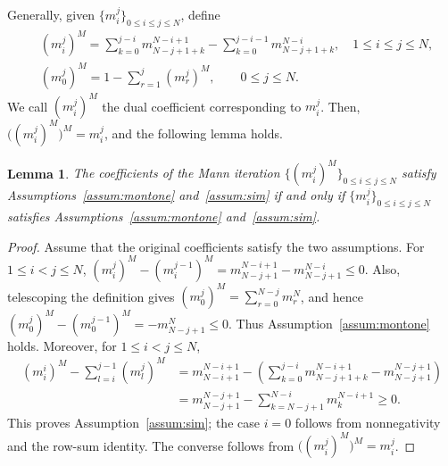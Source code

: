 \documentclass[pdflatex,sn-mathphys-num]{sn-jnl}%
\theoremstyle{thmstyleone}%
\theoremstyle{thmstyletwo}%
\theoremstyle{thmstylethree}%
\newtheorem{lemma}{Lemma}%
\begin{document}
Generally, given $\{m_i^j\}_{0\le i \le j\le N}$, define
\begin{align*}
&(m_i^j)^M=\sum_{k=0}^{j-i}m_{N-j+1+k}^{N-i+1}-\sum_{k=0}^{j-i-1}m_{N-j+1+k}^{N-i}, \quad  1\le i\le j\le N,\\
&(m_0^j)^M=1-\sum_{r=1}^{j}(m_r^j)^M,\qquad 0\le j\le N.
\end{align*}
We call $(m_i^j)^M$ the dual coefficient corresponding to $m_i^j$. 
Then, $\bigl((m_i^j)^M\bigr)^M=m_i^j$, and the following lemma holds.

\begin{lemma}\label{m_dual_coef}
The coefficients of the Mann iteration $\{(m_i^j)^M\}_{0\le i \le j\le N}$ satisfy Assumptions~\ref{assum:montone} and~\ref{assum:sim} if and only if $\{m_i^j\}_{0\le i \le j\le N}$ satisfies Assumptions~\ref{assum:montone} and~\ref{assum:sim}.
\end{lemma}


\begin{proof}
Assume that the original coefficients satisfy the two assumptions. For $1\le i<j\le N$, $(m_i^j)^M-(m_i^{j-1})^M=m_{N-j+1}^{N-i+1}-m_{N-j+1}^{N-i}\le0.$
Also, telescoping the definition gives $(m_0^j)^M=\sum_{r=0}^{N-j}m_r^N$, and hence $(m_0^j)^M-(m_0^{j-1})^M=- m_{N-j+1}^N \le 0.$
Thus Assumption~\ref{assum:montone} holds. Moreover, for $1\le i<j\le N$,
\begin{align*}
(m_i^i)^M-\sum_{l=i}^{j-1}(m_l^j)^M
&=m_{N-i+1}^{N-i+1}-\left(\sum_{k=0}^{j-i}m_{N-j+1+k}^{N-i+1}-m_{N-j+1}^{N-j+1}\right)
\\&=m_{N-j+1}^{N-j+1}-\sum_{k=N-j+1}^{N-i}m_k^{N-i+1} \ge 0.    
\end{align*}
This proves Assumption~\ref{assum:sim}; the case $i=0$ follows from nonnegativity and the row-sum identity. The converse follows from $\bigl((m_i^j)^M\bigr)^M=m_i^j$.
\end{proof}
\end{document}
